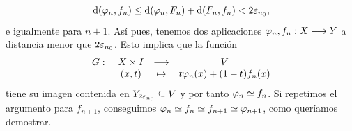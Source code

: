 \begin{gather*}
  \dd(\varphi_n,f_n)\leq \dd(\varphi_n,F_n)+\dd(F_n,f_n)<2\varepsilon_{n_0},
\end{gather*}
e igualmente para $ n+1$. Así pues, tenemos dos aplicaciones $ \varphi_n,f_n:X\longrightarrow Y  $ a distancia menor que $ 2\varepsilon_{n_0} $. Esto implica que la función 
\begin{gather*}
  \begin{matrix}
  G : \ &X\times I  &\longrightarrow &V  \\
  &(x,t) &\mapsto &t\varphi_n(x) +(1-t)f_n(x) 
  \end{matrix}  
\end{gather*}
tiene su imagen contenida en $ Y_{2\varepsilon_{n_0}}\subseteq V  $ y por tanto $ \varphi_n\simeq f_n  $. Si repetimos el argumento para $ f_{n+1} $, conseguimos $ \varphi_n \simeq f_n\simeq f_{n+1}\simeq \varphi_{n+1} $, como queríamos demostrar.

